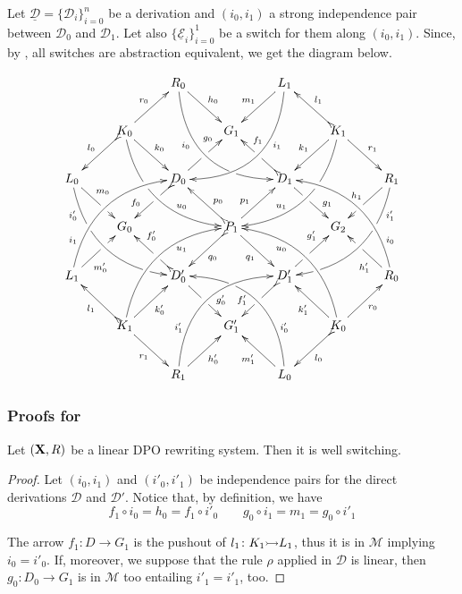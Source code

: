 \documentclass[a4paper,UKenglish,cleveref,pdftex, thm-restate,numberwithinsect,anonymous]{lipics}
\newcommand{\mto}[0]{\scalebox{1}{$\rightarrowtail$}}
\def\R{\mathsf{R}}
\def\X{\textbf {\textup{X}}}
\newcommand{\dder}[1]{\mathscr{#1}}
\newcommand{\der}[1]{\underline{\dder{#1}}}
\begin{document}
\begin{remark}\label{rem:fill} Let $\der{D}=\{\dder{D}_i\}_{i=0}^n$ be a derivation and $(i_0, i_1)$ a strong independence pair between $\dder{D}_0$ and $\dder{D}_1$. Let also $\{\der{E}_{i}\}_{i=0}^1$ be a switch for them along $(i_0, i_1)$. Since, by , all switches are abstraction equivalent, we get the diagram below.
	
	\[\xymatrix{&&R_0 \ar@/_1cm/[ddrr]_(.35){i_0}|(.7)\hole
		\ar[dr]^{h_0}&& L_1\ar@/^1cm/[ddll]^(.35){i_1}
		\ar[dl]_{m_1}\\&K_0\ar[dr]^{k_0}\ar@{>->}[dl]_{l_0}
		\ar@/_.8cm/[ddrr]|(.36)\hole^(.65){u_0}\ar[ur]^{r_0}&& G_1 &&
		K_1
		\ar@/^.8cm/[ddll]|(.36)\hole_(.65){u_1}\ar[dl]_{k_1}\ar@{>->}[lu]_{l_1}
		\ar[dr]^{r_1}\\L_0
		\ar@/_.8cm/[ddrr]_(.2){i'_0}|(.31)\hole|(.81)\hole
		\ar[dr]^(.4){m_0}|(.61)\hole && D_0
		\ar@{>->}[dl]|(.4)\hole_(.65){f_0}\ar[ur]|(.5)\hole^(.7){g_0}&&D_1
		\ar[dr]|(.4)\hole^(.65){g_1}
		\ar@{>->}[ul]|(.5)\hole_(.65){f_1}&&R_1\ar@/^.8cm/[ddll]^(.2){i'_1}|(.31)\hole|(.81)\hole\ar[dl]_{h_1}|(.6)\hole\\&G_0
		&&P_1\ar[dr]_{q_1}	\ar@{>->}[dl]^{q_0}\ar[ur]^(.4){p_1}\ar@{>->}[ul]_(.4){p_0}&&G_2\\L_1	\ar@/^.8cm/[uurr]^(.2){i_1} \ar[ur]_(.35){m'_0}|(.61)\hole && D'_0	\ar@{>->}[ul]|(.4)\hole_(.65){f'_0}\ar[dr]|(.5)\hole^(.65){g'_0}	&&D'_1\ar[ur]|(.4)\hole^(.65){g'_1} \ar@{>->}[dl]|(.5)\hole_(.65){f'_1}	&& R_0 \ar[ul]^(.35){h'_1}|(.61)\hole\ar@/_.8cm/[uull]_(.2){i_0}\\ &K_1	\ar[ur]_{k'_0} \ar[dr]_{r_1}	\ar@{>->}[ul]^{l_1}\ar@/^.8cm/[uurr]_(.65){u_1}&&G'_1&& K_0\ar[ur]_{r_0} \ar[ul]^{k'_1} \ar@{>->}[dl]^{l_0} \ar@/_.8cm/[uull]^(.65){u_0}\\&& R_1	\ar[ur]_{h'_0}\ar@/^1cm/[uurr]^(.25){i'_1}&& L_0 \ar[ul]^{m'_1} \ar@/_1cm/[uull]_(.25){i'_0} |(.69)\hole }\] 

\end{remark}


\subsubsection{Proofs for }

\begin{proposition}
	\label{pr:weak}
	Let $(\X, \R)$ be a linear DPO rewriting system. Then it is well switching.
\end{proposition}
\begin{proof}
	
	Let $(i_0, i_1)$ and $(i'_0, i'_1)$ be independence pairs for the
	direct derivations $\dder{D}$ and $\dder{D}'$. Notice that, by
	definition, we have
	\[
	f_1\circ i_0=h_0=f_1\circ i'_0 \qquad g_0\circ i_1=m_1= g_0\circ i'_1
	\]
	
	The arrow $f_1\colon D\to G_1$ is the pushout of
	$l_1\colon K_1\mto L_1$, thus it is in $\mathcal{M}$ implying
	$i_0=i'_0$. If, moreover, we suppose that the rule $\rho$ applied in
	$\dder{D}$ is linear, then $g_0\colon D_0\to G_1$ is in
	$\mathcal{M}$ too entailing $i'_1=i'_1$, too.
\end{proof}
\end{document}

